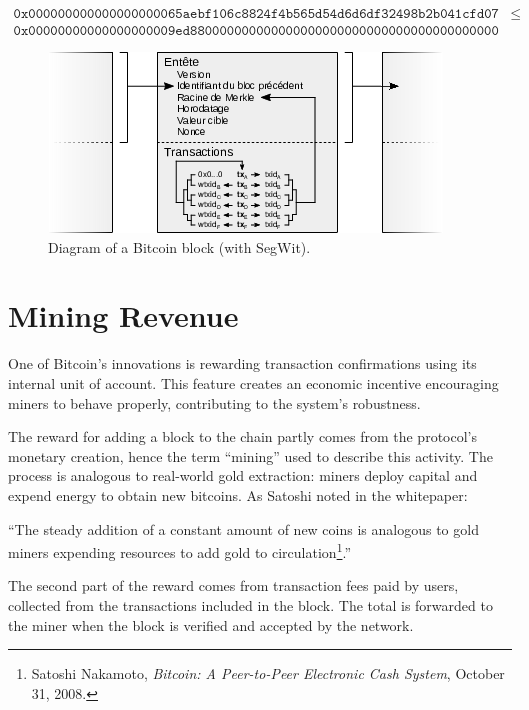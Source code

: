 \documentclass[
  a5paper,
  smalldemyvopaper,10pt,twoside,onecolumn,openright,extrafontsizes,hidelinks]{memoir}
\begin{document}
\[\begin{aligned}
\mathtt{0x000000000000000000065aebf106c8824f4b565d54d6d6df32498b2b041cfd07} & \le \\ \mathtt{0x00000000000000000009ed880000000000000000000000000000000000000000} & ~
\end{aligned}\]

\begin{figure}

{\centering \includegraphics{chapters/img/bitcoin-segwit-block.png}

}

\caption{Diagram of a Bitcoin block (with SegWit).}

\end{figure}%

\section*{Mining Revenue}\label{le-revenu-du-minage}


One of Bitcoin's innovations is rewarding transaction confirmations
using its internal unit of account. This feature creates an economic
incentive encouraging miners to behave properly, contributing to the
system's robustness.

The reward for adding a block to the chain partly comes from the
protocol's monetary creation, hence the term ``mining'' used to describe
this activity. The process is analogous to real-world gold extraction:
miners deploy capital and expend energy to obtain new bitcoins. As
Satoshi noted in the whitepaper:

``The steady addition of a constant amount of new coins is analogous to
gold miners expending resources to add gold to circulation\footnote{Satoshi
  Nakamoto, \emph{Bitcoin: A Peer-to-Peer Electronic Cash System},
  October 31, 2008.}.''

The second part of the reward comes from transaction fees paid by users,
collected from the transactions included in the block. The total is
forwarded to the miner when the block is verified and accepted by the
network.
\end{document}
